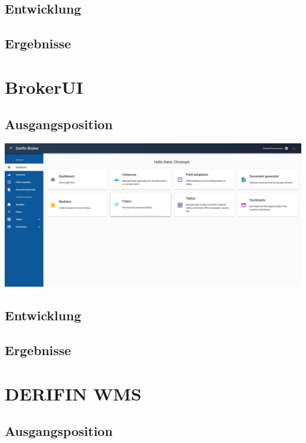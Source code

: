 \documentclass[chapterprefix=false, 12pt, a4paper, oneside, parskip=half, listof=totoc, bibliography=totoc, numbers=noendperiod]{scrbook}
\begin{document}
    \subsection{Entwicklung}

    \subsection{Ergebnisse}

    \section{BrokerUI}

    \subsection{Ausgangsposition}

    \includegraphics[width=1.00\textwidth]{img/broker-ui-neu.png}


    \subsection{Entwicklung}

    \subsection{Ergebnisse}

    \section{DERIFIN WMS}

    \subsection{Ausgangsposition}
\end{document}
